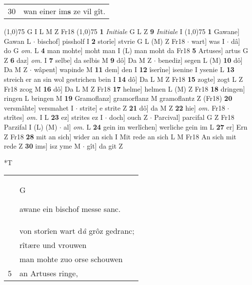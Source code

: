\documentclass[8pt,a4paper,notitlepage]{article}
\begin{document}
\begin{table}[ht]
\begin{minipage}[t]{0.5\linewidth}
\begin{tabular}{rl}
30 & wan einer im\textbf{s} ze vil gît.\\ 
\end{tabular}
\scriptsize
\line(1,0){75} \newline
G I L M Z Fr18 \newline
\line(1,0){75} \newline
\textbf{1} \textit{Initiale} G L Z  \textbf{9} \textit{Initiale} I  \newline
\line(1,0){75} \newline
\textbf{1} Gawane] Gawan L  $\cdot$ bischof] pissholf I \textbf{2} storîe] stvrie G L (M) Z Fr18  $\cdot$ wart] was I  $\cdot$ dâ] do G \textit{om.} L \textbf{4} man mohte] moht man I (L) man moht da Fr18 \textbf{5} Artuses] artus G Z \textbf{6} daz] \textit{om.} I \textbf{7} selbe] da selbis M \textbf{9} dô] Da M Z  $\cdot$ benediz] segen L (M) \textbf{10} dô] Da M Z  $\cdot$ wâpent] wapinde M \textbf{11} dem] den I \textbf{12} îserîne] isenine I ysenie L \textbf{13} streich er an sin wol gestrichen bein I \textbf{14} dô] Da L M Z Fr18 \textbf{15} zogte] zogt L Z Fr18 zcog M \textbf{16} dô] Da L M Z Fr18 \textbf{17} helme] helmen L (M) Z Fr18 \textbf{18} dringen] ringen L bringen M \textbf{19} Gramoflanz] gramorflanz M gramoflantz Z (Fr18) \textbf{20} versmâhte] versmahet I  $\cdot$ strite] e strite Z \textbf{21} dô] da M Z \textbf{22} hie] \textit{om.} Fr18  $\cdot$ strîtes] \textit{om.} I L \textbf{23} ez] strites ez I  $\cdot$ doch] ouch Z  $\cdot$ Parcival] parcifal G Z Fr18 Parzifal I (L) (M)  $\cdot$ al] \textit{om.} L \textbf{24} gein im werlîchen] werliche gein im L \textbf{27} er] Ern Z Fr18 \textbf{28} mit an sich] wider an sich I Mit rede an sich L M Fr18 An sich mit rede Z \textbf{30} ims] isz yme M  $\cdot$ gît] da git Z \newline
\end{minipage}
\hspace{0.5cm}
\begin{minipage}[t]{0.5\linewidth}
\small
\begin{center}*T
\end{center}
\begin{tabular}{rl}
 & \begin{large}G\end{large}awane ein bischof messe sanc.\\ 
 & von storîen wart d\textit{â} grôz gedranc;\\ 
 & rîtære und vrouwen\\ 
 & man mohte zuo orse schouwen\\ 
5 & an Artuses ringe,\\ 

\end{tabular}
\end{minipage}
\end{table}
\end{document}
